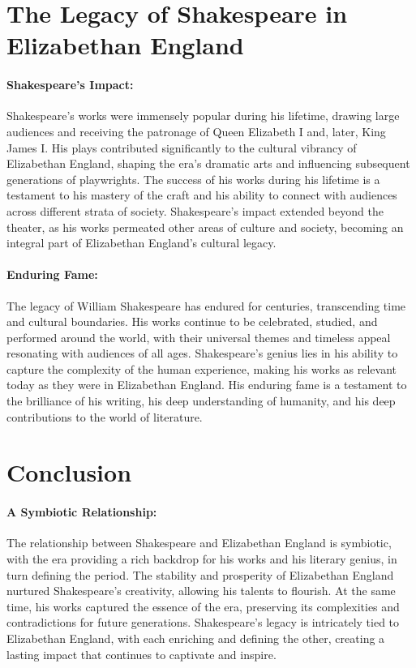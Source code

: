 \documentclass{book}
\begin{document}
\section*{The Legacy of Shakespeare in Elizabethan England}

\paragraph{Shakespeare’s Impact:}
Shakespeare’s works were immensely popular during his lifetime, drawing large audiences and receiving the patronage of Queen Elizabeth I and, later, King James I. His plays contributed significantly to the cultural vibrancy of Elizabethan England, shaping the era’s dramatic arts and influencing subsequent generations of playwrights. The success of his works during his lifetime is a testament to his mastery of the craft and his ability to connect with audiences across different strata of society. Shakespeare’s impact extended beyond the theater, as his works permeated other areas of culture and society, becoming an integral part of Elizabethan England’s cultural legacy.

\paragraph{Enduring Fame:}
The legacy of William Shakespeare has endured for centuries, transcending time and cultural boundaries. His works continue to be celebrated, studied, and performed around the world, with their universal themes and timeless appeal resonating with audiences of all ages. Shakespeare’s genius lies in his ability to capture the complexity of the human experience, making his works as relevant today as they were in Elizabethan England. His enduring fame is a testament to the brilliance of his writing, his deep understanding of humanity, and his deep contributions to the world of literature.

\section*{Conclusion}

\paragraph{A Symbiotic Relationship:}
The relationship between Shakespeare and Elizabethan England is symbiotic, with the era providing a rich backdrop for his works and his literary genius, in turn defining the period. The stability and prosperity of Elizabethan England nurtured Shakespeare’s creativity, allowing his talents to flourish. At the same time, his works captured the essence of the era, preserving its complexities and contradictions for future generations. Shakespeare’s legacy is intricately tied to Elizabethan England, with each enriching and defining the other, creating a lasting impact that continues to captivate and inspire.
\end{document}

